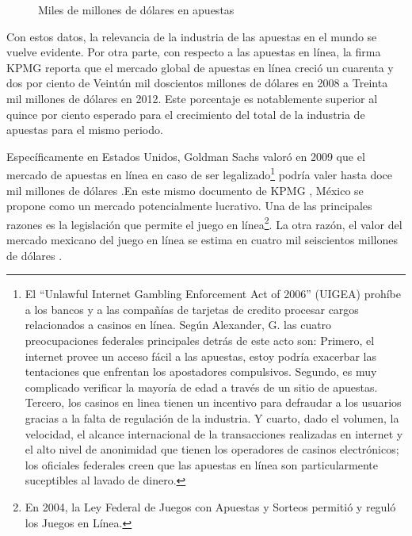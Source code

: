 \begin{figure}[!htb]\centering
   \begin {minipage}{0.85\textwidth}
     \caption{Miles de millones de dólares en apuestas}\label{Fig:gasto-apuestas}
   \end{minipage}
\end{figure}

Con estos datos, la relevancia de la industria de las apuestas en el mundo se vuelve evidente.  Por otra parte, con respecto a las apuestas en línea, la firma KPMG \cite{kpmgOnlineGaming} reporta que el mercado global de apuestas en línea creció un cuarenta y dos por ciento de Veintún mil doscientos millones de dólares en 2008 a Treinta mil millones de dólares en 2012. Este porcentaje es notablemente superior al quince por ciento esperado para el crecimiento del total de la industria de apuestas para el mismo periodo. 

Específicamente en Estados Unidos, Goldman Sachs valoró en 2009 que el mercado de apuestas en línea en caso de ser legalizado\footnote{El ``Unlawful Internet Gambling Enforcement Act of 2006'' (UIGEA)  prohíbe a los bancos y a las compañías de tarjetas de credito procesar cargos relacionados a casinos en línea. Según Alexander, G. \cite{alexander2008us} las cuatro preocupaciones federales principales detrás de este acto son: Primero, el internet provee un acceso fácil a las apuestas, estoy podría exacerbar las tentaciones que enfrentan los apostadores compulsivos. Segundo, es muy complicado verificar la mayoría de edad a través de un sitio de apuestas. Tercero, los casinos en linea tienen un incentivo para defraudar a los usuarios gracias a la falta de regulación de la industria. Y cuarto, dado el volumen, la velocidad, el alcance internacional de la transacciones realizadas en internet y el alto nivel de anonimidad que tienen los operadores de casinos electrónicos; los oficiales federales creen que las apuestas en línea son particularmente suceptibles al lavado de dinero.} podría valer hasta doce mil millones de dólares \cite{goldmanParty}.En este mismo documento de KPMG \cite{kpmgOnlineGaming}, México se propone como un mercado potencialmente lucrativo. Una de las principales razones es la legislación que permite el juego en línea\footnote{En 2004, la Ley Federal de Juegos con Apuestas y Sorteos permitió y reguló los Juegos en Línea.}. La otra razón, el valor del mercado mexicano del juego en línea se estima en cuatro mil seiscientos millones de dólares \cite{yogonet}.

